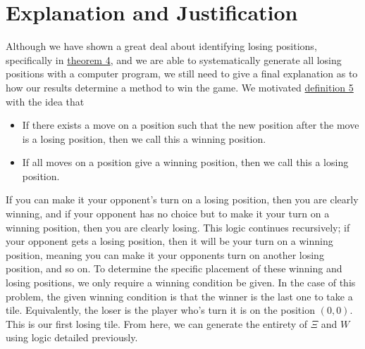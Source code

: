 \documentclass[11pt, letterpaper]{article}
\begin{document}
\section{Explanation and Justification}\label{sec:5}
Although we have shown a great deal about identifying losing positions, specifically in \hyperref[thm:4]{theorem 4}, and we are able to systematically generate all losing positions with a computer program, we still need to give a final explanation as to how our results determine a method to win the game. We motivated \hyperref[dfn:5]{definition 5} with the idea that
\begin{itemize}
	\item If there exists a move on a position such that the new position after the move is a losing position, then we call this a winning position.
	\item If all moves on a position give a winning position, then we call this a losing position.
\end{itemize}

If you can make it your opponent's turn on a losing position, then you are clearly winning, and if your opponent has no choice but to make it your turn on a winning position, then you are clearly losing. This logic continues recursively; if your opponent gets a losing position, then it will be your turn on a winning position, meaning you can make it your opponents turn on another losing position, and so on. To determine the specific placement of these winning and losing positions, we only require a winning condition be given. In the case of this problem, the given winning condition is that the winner is the last one to take a tile. Equivalently, the loser is the player who's turn it is on the position $(0,0)$. This is our first losing tile. From here, we can generate the entirety of $\Xi $ and $W$ using logic detailed previously.
\end{document}
